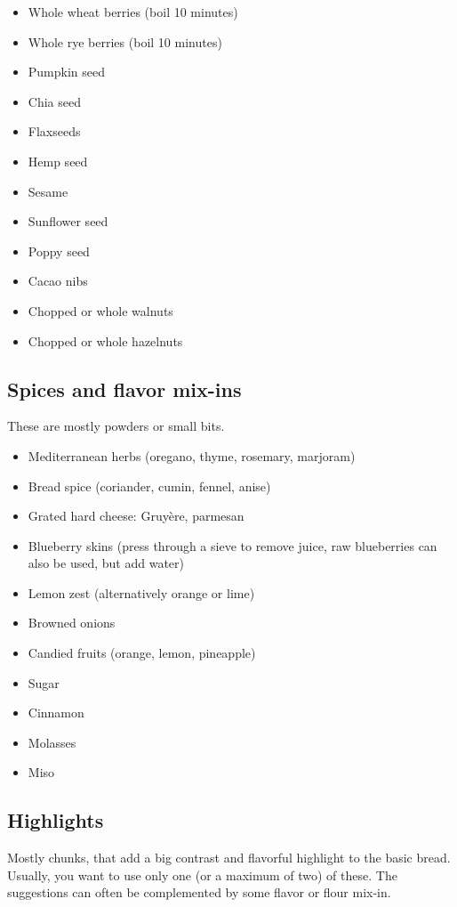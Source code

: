 \begin{itemize}
  \item Whole wheat berries (boil 10 minutes)
  \item Whole rye berries (boil 10 minutes)
  \item Pumpkin seed
  \item Chia seed
  \item Flaxseeds
  \item Hemp seed
  \item Sesame
  \item Sunflower seed
  \item Poppy seed
  \item Cacao nibs
  \item Chopped or whole walnuts
  \item Chopped or whole hazelnuts
\end{itemize}

\subsection{Spices and flavor mix-ins}
These are mostly powders or small bits.

\begin{itemize}
  \item Mediterranean herbs (oregano, thyme, rosemary, marjoram)
  \item Bread spice (coriander, cumin, fennel, anise)
  \item Grated hard cheese: Gruyère, parmesan
  \item Blueberry skins (press through a sieve to remove juice, raw blueberries
      can also be used, but add water)
  \item Lemon zest (alternatively orange or lime)
  \item Browned onions
  \item Candied fruits (orange, lemon, pineapple)
  \item Sugar
  \item Cinnamon
  \item Molasses
  \item Miso
\end{itemize}

\subsection{Highlights}
Mostly chunks, that add a big contrast and flavorful highlight to the basic
bread. Usually, you want to use only one (or a maximum of two) of these. The suggestions
can often be complemented by some flavor or flour mix-in.

